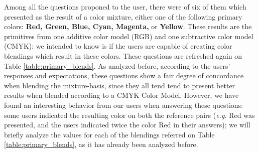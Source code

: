 %
Among all the questions proponed to the user, there were of six of them which presented as the result of a color mixture, either one of the following primary colors: \textbf{Red, Green, Blue, Cyan, Magenta,}
or \textbf{Yellow}. These results are the primitives from one additive color model (RGB) and one subtractive color model (CMYK): we intended to know is if the users are capable of creating color blendings
which result in these colors. These questions are refreshed again on Table \ref{table:primary_blends}.
%
As analyzed before, according to the users' responses and expectations, these questions show a fair degree of concordance when blending the mixture-basis, since they all tend tend to present better results when
blended according to a CMYK Color Model. However, we have found an interesting behavior from our users when answering these questions: some users indicated the resulting color on both the reference pairs (\emph{e.g.}
Red was presented, and the users indicated twice the color Red in their answers); we will briefly analyze the values for each of the blendings referred on Table \ref{table:primary_blends}, as it has already been
analyzed before.
%
